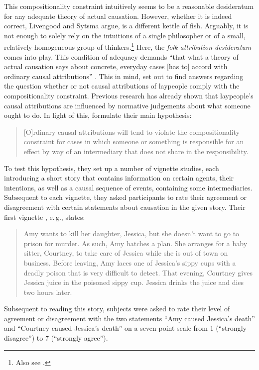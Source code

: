\documentclass[12pt]{scrartcl}
\begin{document}
This compositionality constraint intuitively seems to be a reasonable desideratum for any adequate theory of actual causation. However, whether it is indeed correct, Livengood and Sytsma argue, is a different kettle of fish. Arguably, it is not enough to solely rely on the intuitions of a single philosopher or of a small, relatively homogeneous group of thinkers.\footnote{Also see \citet*{bauer_two_2020}.} Here, the \textit{folk attribution desideratum} \citep{livengood_following_2017} comes into play. This condition of adequacy demands \enquote{that what a theory of actual causation says about concrete, everyday cases [has to] accord with ordinary causal attributions} \citep[48]{livengood_actual_2020}. This in mind, \citeauthor*{livengood_actual_2020} set out to find answers regarding the question whether or not causal attributions of laypeople comply with the compositionality constraint. Previous research has already shown that laypeople's causal attributions are influenced by normative judgements about what someone ought to do. In light of this, \citet*[48]{livengood_actual_2020} formulate their main hypothesis:
%
\begin{quote}
   \small [O]rdinary causal attributions will tend to violate the compositionality constraint for cases in which someone or something is responsible for an effect by way of an intermediary that does not share in the responsibility.
\end{quote}
%
To test this hypothesis, they set up a number of vignette studies, each introducing a short story that contains information on certain agents, their intentions, as well as a causal sequence of events, containing some intermediaries. Subsequent to each vignette, they asked participants to rate their agreement or disagreement with certain statements about causation in the given story. Their first vignette \citep[49]{livengood_actual_2020}, e.\,g., states:
%
\begin{quote}
   \small Amy wants to kill her daughter, Jessica, but she doesn't want to go to prison for murder. As such, Amy hatches a plan. She arranges for a baby sitter, Courtney, to take care of Jessica while she is out of town on business. Before leaving, Amy laces one of Jessica's sippy cups with a deadly poison that is very difficult to detect. That evening, Courtney gives Jessica juice in the poisoned sippy cup. Jessica drinks the juice and dies two hours later.
\end{quote}
%
Subsequent to reading this story, subjects were asked to rate their level of agreement or disagreement with the two statements \enquote{Amy caused Jessica's death} and \enquote{Courtney caused Jessica's death} on a seven-point scale from 1 (\enquote{strongly disagree}) to 7 (\enquote{strongly agree}).
\end{document}
